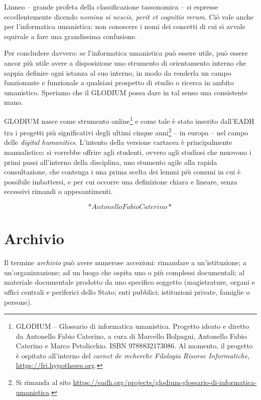 \documentclass[
  b5paper,
  twoside,
  11pt,
  chapterprefix=false,
  bibliography=totocnumbered,
  parskip=0]{scrbook}
\begin{document}
Linneo -- grande profeta della classificazione tassonomica -- si
espresse eccellentemente dicendo \emph{nomina si nescis, perit et cognitio
rerum}. Ciò vale anche per l'informatica umanistica: non conoscere i
nomi dei concetti di cui si avvale equivale a fare una grandissima
confusione.

Per concludere davvero: se l'informatica umanistica può essere utile,
può essere ancor più utile avere a disposizione uno strumento di
orientamento interno che sappia definire ogni istanza al suo interno, in
modo da renderla un campo funzionante e funzionale a qualsiasi prospetto
di studio o ricerca in ambito umanistico. Speriamo che il GLODIUM possa
dare in tal senso una consistente mano.

GLODIUM nasce come strumento online\footnote{GLODIUM -- Glossario di informatica umanistica. Progetto ideato e
  diretto da Antonello Fabio Caterino, a cura di Marcello Bolpagni,
  Antonello Fabio Caterino e Marco Petolicchio. ISBN 9788832173086. Al
  momento, il progetto è ospitato all'interno del \emph{carnet de
  recherche} \emph{Filologia Risorse Informatiche},
  \href{https://fri.hypotheses.org/}{https://fri.hypotheses.org}.} e come tale è stato inserito
dall'EADH tra i progetti più significativi degli ultimi cinque anni\footnote{Si rimanda al sito
  \url{https://eadh.org/projects/glodium-glossario-di-informatica-umanistica}.}
-- in europa -- nel campo delle \emph{digital humanities}. L'intento della
versione cartacea è principalmente manualistico: si vorrebbe offrire
agli studenti, ovvero agli studiosi che muovono i primi passi
all'interno della disciplina, uno stumento agile alla rapida
consultazione, che contenga i una prima scelta dei lemmi più comuni in
cui è possibile imbattersi, e per cui occorre una definizione chiara e
lineare, senza eccessivi rimandi o appesantimenti.

\[*Antonello Fabio Caterino*\]

\hypertarget{archivio}{%
\chapter{Archivio}\label{archivio}}

Il termine \emph{archivio} può avere numerose accezioni: rimandare a
un'istituzione; a un'organizzazione; ad un luogo che ospita uno o più
complessi documentali; al materiale documentale prodotto da uno
specifico soggetto (magistrature, organi e uffici centrali e periferici
dello Stato; enti pubblici; istituzioni private, famiglie o persone).
\end{document}

